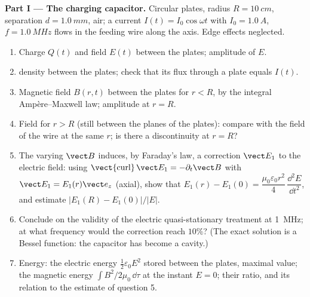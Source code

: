 \begin{problem}
\label{pb:b2:maxwell-equations:1}

\medskip
\noindent\textbf{Part I --- The charging capacitor.}
Circular plates, radius $R = \qty{10}{cm}$, separation $d = \qty{1.0}{mm}$,
air; a current $I(t) = I_0\cos\omega t$ with $I_0 = \qty{1.0}{A}$, $f = \qty{1.0}{MHz}$
flows in the feeding wire along the axis. Edge effects neglected.
\begin{enumerate}
  \item Charge $Q(t)$ and field $E(t)$ between the plates; amplitude of
        $E$.
  \item {} density between the plates; check that
        its flux through a plate equals $I(t)$.
  \item Magnetic field $B(r, t)$ between the plates for $r < R$, by the
        integral Ampère--Maxwell law; amplitude at $r = R$.
  \item Field for $r > R$ (still between the planes of the plates):
        compare with the field of the wire at the same $r$; is there a
        discontinuity at $r = R$?
  \item The varying $\vect B$ induces, by Faraday's law, a correction
        $\vect E_1$ to the electric field: using $\operatorname{\vect{curl}}\vect E_1
        = -\partial_t\vect B$ with $\vect E_1 = E_1(r)\vect e_z$ (axial), show that
        $E_1(r) - E_1(0) = \dfrac{\mu_0\varepsilon_0r^2}4\,\dfrac{\dd^2E}{\dd t^2}$, and
        estimate $|E_1(R) - E_1(0)|/|E|$.
  \item Conclude on the validity of the electric quasi-stationary
        treatment at \qty{1}{MHz}; at what frequency would the correction
        reach $10\%$? (The exact solution is a Bessel function: the
        capacitor has become a cavity.)
  \item Energy: the electric energy $\tfrac12\varepsilon_0E^2$ stored between the
        plates, maximal value; the magnetic energy $\int B^2/2\mu_0\,\dd\tau$
        at the instant $E = 0$; their ratio, and its relation to the
        estimate of question 5.
\end{enumerate}


\end{problem}
